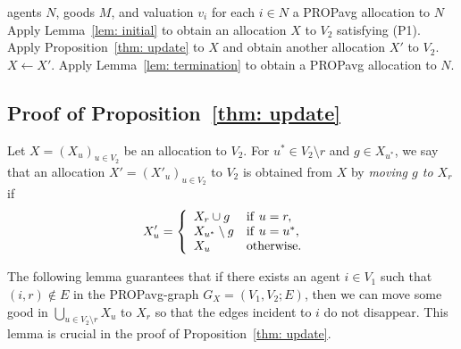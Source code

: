 \documentclass[11pt]{article}
\newcommand{\PROPavg}{\textsf{PROPavg}\xspace}
\begin{document}
\begin{algorithm}[htb]
\caption{ Algorithm for finding a \PROPavg allocation}
\label{alg:01}
\begin{algorithmic}[1]
\Require agents $N$, goods $M$, and valuation $v_i$ for each $i \in N$
\Ensure  a \PROPavg allocation to $N$
\State Apply Lemma~\ref{lem: initial} to obtain an allocation $X$ to $V_2$ satisfying (P1). 
    \State Apply Proposition~\ref{thm: update} to $X$ and obtain another allocation $X'$ to $V_2$. 
    \State $X \leftarrow X'$.
\EndWhile
\State Apply Lemma~\ref{lem: termination} to obtain a \PROPavg allocation to $N$. 
\end{algorithmic}
\end{algorithm}




\subsection{Proof of Proposition~\ref{thm: update}}
\label{sec: update}


Let $X=(X_u)_{u \in V_2}$ be an allocation to $V_2$. 
For $u^* \in V_2\setminus r$ and $g \in X_{u^*}$, 
we say that an allocation $X'=(X'_u)_{u \in V_2}$ to $V_2$ is obtained from $X$ by {\it moving $g$ to $X_r$} 
if \begin{align*}
X'_u &= \left\{ 
\begin{array}{ll}
X_r \cup g & {\rm if}~u=r, \\
X_{u^*}\setminus g & {\rm if}~u=u^*,\\
X_{u} & {\rm otherwise}.
\end{array}
 \right. &
\end{align*}



The following lemma guarantees that if there exists an agent $i \in V_1$ such that $(i,r)\not \in E$ in the \PROPavg-graph $G_X = (V_1, V_2; E)$, then we can move some good in $\bigcup_{u \in V_2 \setminus r} X_u$ to $X_r$ so that the edges incident to $i$ do not disappear.
This lemma is crucial in the proof of Proposition~\ref{thm: update}.
\end{document}
